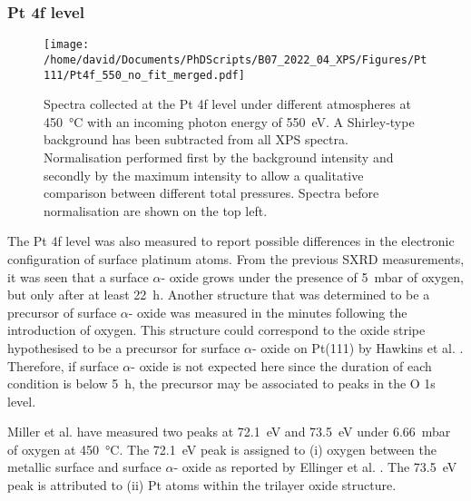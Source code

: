 \subsubsection{Pt 4f level}

\begin{figure}[!htb]
    \centering
    \texttt{[image: /home/david/Documents/PhDScripts/B07\_2022\_04\_XPS/Figures/Pt111/Pt4f\_550\_no\_fit\_merged.pdf]}
    \caption{
        Spectra collected at the Pt 4f level under different atmospheres at \qty{450}{\degreeCelsius} with an incoming photon energy of \qty{550}{\eV}.
        A Shirley-type background has been subtracted from all XPS spectra.
        Normalisation performed first by the background intensity and secondly by the maximum intensity to allow a qualitative comparison between different total pressures.
        Spectra before normalisation are shown on the top left.
    }
    \label{fig:Pt4fPt111}
\end{figure}


The Pt 4f level was also measured to report possible differences in the electronic configuration of surface platinum atoms.
From the previous SXRD measurements, it was seen that a surface $\alpha$- oxide grows under the presence of \qty{5}{\milli\bar} of oxygen, but only after at least \qty{22}{\hour}.
Another structure that was determined to be a precursor of surface $\alpha$- oxide was measured in the minutes following the introduction of oxygen.
This structure could correspond to the oxide stripe hypothesised to be a precursor for surface $\alpha$- oxide on Pt(111) by Hawkins et al. \parencite*{Hawkins2009}.
Therefore, if surface $\alpha$- oxide is not expected here since the duration of each condition is below \qty{5}{\hour}, the precursor may be associated to peaks in the O 1s level.

Miller et al. \parencite*{Miller2011} have measured two peaks at \qty{72.1}{\eV} and \qty{73.5}{\eV} under \qty{6.66}{\milli\bar} of oxygen at \qty{450}{\degreeCelsius}.
The \qty{72.1}{\eV} peak is assigned to (i) oxygen between the metallic surface and surface $\alpha$- oxide as reported by Ellinger et al. \parencite*{Ellinger2008}.
The \qty{73.5}{\eV} peak is attributed to (ii) Pt atoms within the trilayer oxide structure.

